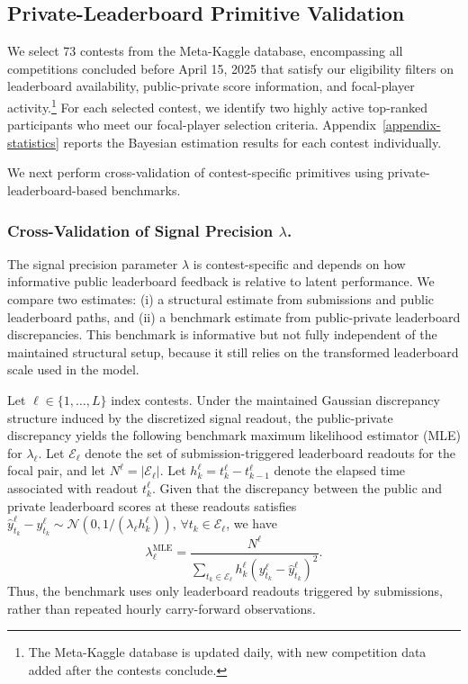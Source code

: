 \documentclass[mnsc]{informs3}
\begin{document}
\subsection{Private-Leaderboard Primitive Validation}\label{sect-validation}


We select 73 contests from the Meta-Kaggle database, encompassing all competitions concluded before April 15, 2025 that satisfy our eligibility filters on leaderboard availability, public-private score information, and focal-player activity.\footnote{
The Meta-Kaggle database is updated daily, with new competition data added after the contests conclude.
}
For each selected contest, we identify two highly active top-ranked participants who meet our focal-player selection criteria.
Appendix~\ref{appendix-statistics} reports the Bayesian estimation results for each contest individually.

We next perform cross-validation of contest-specific primitives using private-leaderboard-based benchmarks.

\subsubsection{Cross-Validation of Signal Precision $\lambda$.}
The signal precision parameter $\lambda$ is contest-specific and depends on how informative public leaderboard feedback is relative to latent performance.
We compare two estimates: (i) a structural estimate from submissions and public leaderboard paths, and (ii) a benchmark estimate from public-private leaderboard discrepancies.
This benchmark is informative but not fully independent of the maintained structural setup, because it still relies on the transformed leaderboard scale used in the model.

Let $\ell\in\{1,\ldots,L\}$ index contests.
Under the maintained Gaussian discrepancy structure induced by the discretized signal readout, the public-private discrepancy yields the following benchmark maximum likelihood estimator (MLE) for $\lambda_\ell$.
Let $\mathcal E_\ell$ denote the set of submission-triggered leaderboard readouts for the focal pair, and let $N^\ell=|\mathcal E_\ell|$.
Let $h_k^\ell=t_k^\ell-t_{k-1}^\ell$ denote the elapsed time associated with readout $t_k^\ell$.
Given that the discrepancy between the public and private leaderboard scores at these readouts satisfies $\hat{y}_{t_k}^\ell - y_{t_k}^\ell \sim \mathcal{N}(0, 1/(\lambda_\ell h_k^\ell))$, $\forall t_k\in\mathcal E_\ell$, we have
\begin{equation*}
\lambda^{\text{MLE}}_\ell =
\frac{N^\ell}
{\sum_{t_k\in\mathcal E_\ell}
h_k^\ell (y_{t_k}^\ell - \hat{y}_{t_k}^\ell)^2}.
\end{equation*}
Thus, the benchmark uses only leaderboard readouts triggered by submissions, rather than repeated hourly carry-forward observations.
\end{document}
